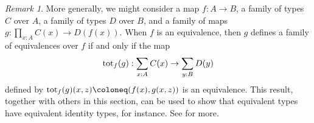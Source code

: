 \documentclass{amsart}
\theoremstyle{theorem}
\newtheorem*{thm}{Theorem}
\theoremstyle{definition}
\theoremstyle{remark}
\newtheorem*{rmk}{Remark}
\newcommand{\0}{\mathbbe{0}}
\newcommand{\1}{\mathbbe{1}}
\newcommand{\2}{\mathbbe{2}}
\newcommand{\3}{\mathbbe{3}}
\newcommand{\4}{\mathbbe{4}}
\newcommand{\term}[1]{{\textup{#1}}}
\newcommand{\type}[1]{{\textup{#1}}}
\newcommand{\UU}{{\mathcal{U}}}
\newcommand{\bool}{\type{bool}}
\newcommand{\true}{\term{true}}
\newcommand{\false}{\term{false}}
\begin{document}
\begin{rmk} More generally, we might consider a map $f \colon A \to B$, a family of types $C$ over $A$, a family of types $D$ over $B$, and a family of maps  $g : \prod_{x:A}C(x) \to D(f(x))$. When $f$ is an equivalence, then $g$ defines a family of equivalences over $f$ if and only if the map
\[ \term{tot}_f(g) : \sum_{x:A}C(x) \to \sum_{y:B}D(y)\] defined by $\term{tot}_f(g)(x,z) \coloneq (f(x),g(x,z))$ is an equivalence. This result, together with others in this section, can be used to show that equivalent types have equivalent identity types, for instance. See \cite[\S11.1]{Rijke} for more.
\end{rmk}

\begin{comment}
Now consider a closely related situation where we are given a map $f \colon A \to B$ and a family $C \colon B \to \UU$. We have a map
\[ \lambda(x,z).(f(x),z): \sum_{x:A} C(f(x)) \to \sum_{y :B}C(y).\]
Again, by the same style of argument, if $f$ is an equivalence then this map is an equivalence (because the fibers are equivalent), but in this case the converse does not hold: consider $\true : \1 \to \bool$ and the type family $\lambda b. \false = b : \bool \to \UU$.

Nevertheless we can use the one-sided implication to extend the previous theorem as follows. Given $f \colon A \to B$ and a family of maps $g : \prod_{x:A}C(x) \to D(f(x))$ where $C$ is a type family over $A$ and $D$ is a type family over $B$, we say that $g$ is a \textbf{family of maps over} $f$. Define
\[ \term{tot}_f(g) : \sum_{x:A}C(x) \to \sum_{y:B}D(y)\] by $\term{tot}_f(g)(x,z) \coloneq (f(x),g(x,z))$.

\begin{thm} Suppose $g$ is a family of maps over $f$ and $f$ is an equivalence. Then the following are logically equivalent:
\begin{enumerate}
\item The family of maps $g$ over $f$ is a family of equivalences.
\item The map $\term{tot}_f(g)$ is an equivalence.
\end{enumerate}
\end{thm}
\begin{proof}
We have a commuting triangle of maps
\[
\begin{tikzcd} \sum_{x:A}C(x) \arrow[rr, "\term{tot}_f(g)"] \arrow[dr, "\term{tot}(g)"'] & & \sum_{y:B}D(y) \\ & \sum_{x:A}D(f(x)) \arrow[ur, "{\lambda(x,z).(f(x),z)}"']
\end{tikzcd}
\]
Since $f$ is an equivalence, the bottom right map is an equivalence. The equivalences are closed under the 2-of-3 property (meaning if any two of a composable pair and their composite are equivalences so is the third map). Thus $\term{tot}(g)$ is an equivalence if and only if $\term{tot}_f(g)$ is an equivalence. And by the previous theorem, the first condition asserts that $g$ is a family of equivalences.
\end{proof}
\end{comment}
\end{document}
